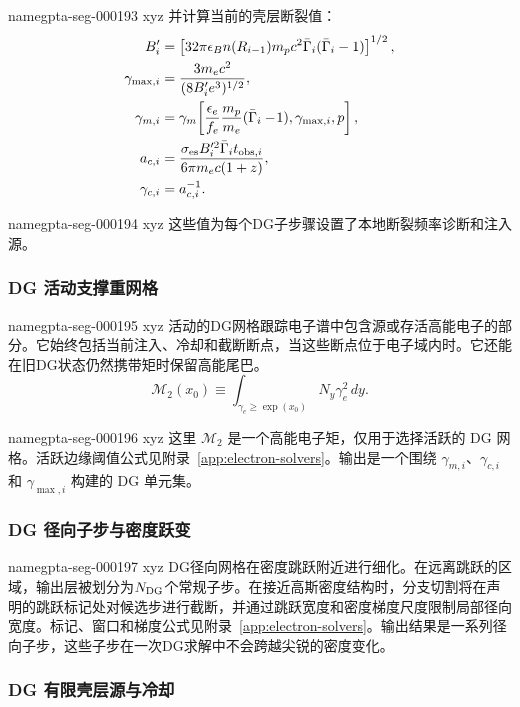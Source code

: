 \documentclass[twocolumn]{aastex702}
\makeatletter
\providecommand{\gptareaderanchor}[1]{\pdfdest name{#1} xyz}%
\providecommand{\gptareaderanchor}[1]{\special{pdf:dest (#1) [ @thispage /XYZ @xpos @ypos null ]}}%
\makeatother
\begin{document}
\gptareaderanchor{gpta-seg-000193}%
并计算当前的壳层断裂值：
\begin{equation}
\begin{aligned}
B_i'&=\left[32\pi\epsilon_B n(R_{i-1})m_pc^2
\bar\Gamma_i(\bar\Gamma_i-1)\right]^{1/2},\\
\gamma_{\max,i}&=\frac{3m_ec^2}{(8B_i'e^3)^{1/2}},\\
\gamma_{m,i}&=\gamma_m\!\left[
\frac{\epsilon_e}{f_e}\frac{m_p}{m_e}(\bar\Gamma_i-\!1),
\gamma_{\max,i},p\right],\\
a_{c,i}&=\frac{\sigma_{\rm es}B_i'^2\bar\Gamma_i t_{{\rm obs},i}}
{6\pi m_ec(1+z)},\\
\gamma_{c,i}&=a_{c,i}^{-1}.
\end{aligned}
\end{equation}

\gptareaderanchor{gpta-seg-000194}%
这些值为每个DG子步骤设置了本地断裂频率诊断和注入源。

\subsubsection{DG 活动支撑重网格}


\gptareaderanchor{gpta-seg-000195}%
活动的DG网格跟踪电子谱中包含源或存活高能电子的部分。它始终包括当前注入、冷却和截断断点，当这些断点位于电子域内时。它还能在旧DG状态仍然携带矩时保留高能尾巴。
\begin{equation}
\mathcal{M}_2(x_0)\equiv
\int_{\gamma_e\ge\exp(x_0)}N_y\gamma_e^2\,dy .
\end{equation}

\gptareaderanchor{gpta-seg-000196}%
这里 \(\mathcal{M}_2\) 是一个高能电子矩，仅用于选择活跃的 DG 网格。活跃边缘阈值公式见附录~\ref{app:electron-solvers}。输出是一个围绕 \(\gamma_{m,i}\)、\(\gamma_{c,i}\) 和 \(\gamma_{\max,i}\) 构建的 DG 单元集。

\subsubsection{DG 径向子步与密度跃变}


\gptareaderanchor{gpta-seg-000197}%
DG径向网格在密度跳跃附近进行细化。在远离跳跃的区域，输出层被划分为\(N_{\rm DG}\)个常规子步。在接近高斯密度结构时，分支切割将在声明的跳跃标记处对候选步进行截断，并通过跳跃宽度和密度梯度尺度限制局部径向宽度。标记、窗口和梯度公式见附录~\ref{app:electron-solvers}。输出结果是一系列径向子步，这些子步在一次DG求解中不会跨越尖锐的密度变化。

\subsubsection{DG 有限壳层源与冷却}
\end{document}
